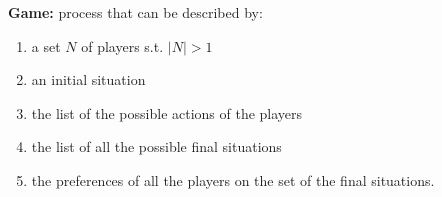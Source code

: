 
%


\noindent \textbf{Game:} process that can be described by:
\begin{enumerate}
	\item a set $N$ of players s.t. $|N| > 1$
	\item an initial situation
	\item the list of the possible actions of the players
	\item the list of all the possible final situations
	\item the preferences of all the players on the set of the final 
	situations.
\end{enumerate}

